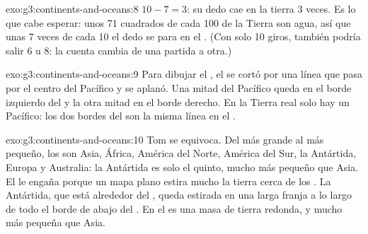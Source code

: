\begin{solution}{exo:g3:continents-and-oceans:8}
$10 - 7 = 3$: su dedo cae en la tierra 3 veces. Es lo que cabe esperar: unos
71 cuadrados de cada 100 de la Tierra son agua, así que unas 7 veces de
cada 10 el dedo se para en el . (Con solo 10 giros, también podría salir
6 u 8: la cuenta cambia de una partida a otra.)
\end{solution}

\begin{solution}{exo:g3:continents-and-oceans:9}
Para dibujar el , el  se cortó por una línea que pasa por el
centro del  Pacífico y se aplanó. Una mitad del Pacífico queda en el
borde izquierdo del  y la otra mitad en el borde derecho. En la Tierra
real solo hay un  Pacífico: los dos bordes del  son la misma
línea en el .
\end{solution}

\begin{solution}{exo:g3:continents-and-oceans:10}
Tom se equivoca. Del más grande al más pequeño, los  son Asia,
África, América del Norte, América del Sur, la Antártida, Europa y
Australia: la Antártida es solo el quinto, mucho más pequeño que Asia. El
 le engaña porque un mapa plano estira mucho la tierra cerca de
los . La Antártida, que está alrededor del , queda estirada en
una larga franja a lo largo de todo el borde de abajo del . En el  es una masa de tierra redonda, y mucho más pequeña que Asia.
\end{solution}
